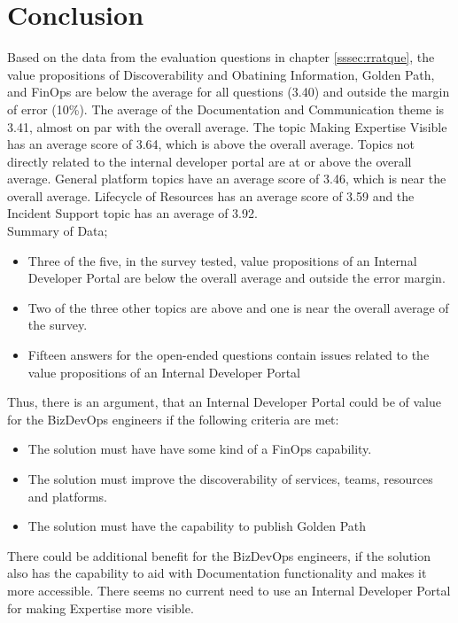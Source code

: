 \documentclass[a4paper,12pt]{article}
\begin{document}
    \section{Conclusion}
    \label{sec:conclusion}
    Based on the data from the evaluation questions in chapter \ref{sssec:rratque}, the value propositions of
    Discoverability and Obatining Information, Golden Path, and FinOps are below the average for all questions (3.40)
    and outside the margin of error (10\%).
    The average of the Documentation and Communication theme is 3.41, almost on par with the overall average.
    The topic Making Expertise Visible has an average score of 3.64, which is above the overall average.
    Topics not directly related to the internal developer portal are at or above the overall average.
    General platform topics have an average score of 3.46, which is near the overall average.
    Lifecycle of Resources has an average score of 3.59 and the Incident Support topic has an average of 3.92.\\
    Summary of Data;
    \begin{itemize}
        \item Three of the five, in the survey tested, value propositions of an Internal Developer Portal are below the overall average and outside the error margin.
        \item Two of the three other topics are above and one is near the overall average of the survey.
        \item Fifteen answers for the open-ended questions contain issues related to the value propositions of an Internal Developer Portal
    \end{itemize}
    Thus, there is an argument, that an Internal Developer Portal could be of value for the BizDevOps engineers if the following
    criteria are met:
    \begin{itemize}
        \item The solution must have have some kind of a FinOps capability.
        \item The solution must improve the discoverability of services, teams, resources and platforms.
        \item The solution must have the capability to publish Golden Path
    \end{itemize}
    There could be additional benefit for the BizDevOps engineers, if the solution also has the capability to aid with
    Documentation functionality and makes it more accessible.
    There seems no current need to use an Internal Developer Portal for making Expertise more visible.
\end{document}
